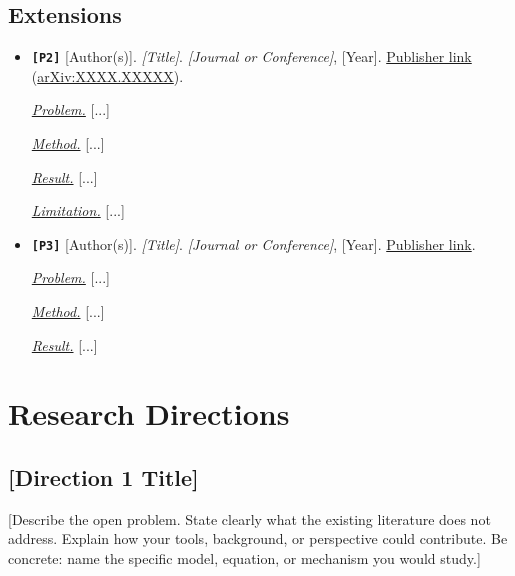 \documentclass[10pt]{article}
\newcommand{\papercode}[1]{\textcolor{papergreen}{\texttt{[#1]}}}
\newcommand{\papercodehead}[1]{\textbf{\papercode{#1}}}
\newcommand{\pmrl}[1]{\underline{\textit{#1}}}
\begin{document}
\subsection{Extensions}

\begin{itemize}[leftmargin=*]

\item {}\label{paper:P2}\papercodehead{P2}
[Author(s)].
\emph{[Title]}.
\emph{[Journal or Conference]}, [Year].
\href{https://doi.org/...}{Publisher link}
(\href{https://arxiv.org/abs/...}{arXiv:XXXX.XXXXX}).

\pmrl{Problem.} [...]

\pmrl{Method.} [...]

\pmrl{Result.} [...]

\pmrl{Limitation.} [...]

\item {}\label{paper:P3}\papercodehead{P3}
[Author(s)].
\emph{[Title]}.
\emph{[Journal or Conference]}, [Year].
\href{https://doi.org/...}{Publisher link}.

\pmrl{Problem.} [...]

\pmrl{Method.} [...]

\pmrl{Result.} [...]

\end{itemize}

\section{Research Directions}\label{sec:directions}

\subsection{[Direction 1 Title]}

[Describe the open problem. State clearly what the existing literature
does not address. Explain how your tools, background, or perspective
could contribute. Be concrete: name the specific model, equation, or
mechanism you would study.]

\end{document}
